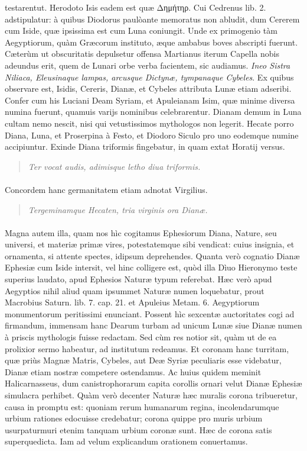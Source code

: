 \documentclass[a4paper, 11pt, oneside, polutonikogreek, latin]{article}
\begin{document}
testarentut. Herodoto Isis eadem est quæ Δημήτηρ. Cui Cedrenus lib. 2. adstipulatur: à quibus Diodorus paulòante memoratus non abludit, dum Cererem cum Iside, quæ ipsissima est cum Luna coniungit. Unde ex primogenio tàm Aegyptiorum, quàm Græcorum instituto, æque ambabus boves abscripti fuerunt. Cæterùm ut obscuritatis depulsetur offensa Martianus iterum Capella nobis adeundus erit, quem de Lunari orbe verba facientem, sic audiamus. \emph{Ineo Sistra Niliaca, Eleusinaque lampas, arcusque Dictynæ, tympanaque Cybeles}. Ex quibus observare est, Isidis, Cereris, Dianæ, et Cybeles attributa Lunæ etiam adseribi. Confer cum his Luciani Deam Syriam, et Apuleianam Isim, quæ minime diversa numina fuerunt, quamuis varijs nominibus celebrarentur. Dianam demum in Luna cultam nemo nescit, nisi qui vetustissimos mythologos non legerit. Hecate porro Diana, Luna, et Proserpina à Festo, et Diodoro Siculo pro uno eodemque numine accipiuntur. Exinde Diana triformis fingebatur, in quam extat Horatij versus.
\begin{quote}
\emph{Ter vocat audis, adimisque letho diua triformis.}
\end{quote}
\vspace*{-4mm}
\paragraph{}
Concordem hanc germanitatem etiam adnotat Virgilius.
\begin{quote}
\emph{Tergeminamque Hecaten, tria virginis ora Dianæ.}
\end{quote}
\vspace*{-4mm}
\paragraph{}
Magna autem illa, quam nos hìc cogitamus Ephesiorum Diana, Nature, seu universi, et materiæ primæ vires, potestatemque sibi vendicat: cuius insignia, et ornamenta, si attente spectes, idipsum deprehendes. Quanta verò cognatio Dianæ Ephesiæ cum Iside intersit, vel hinc colligere est, quòd illa Dìuo Hieronymo teste superius laudato, apud Ephesios Naturæ typum referebat. Hæc verò apud Aegyptios nihil aliud quam ipsummet Naturæ numen loquebatur, prout Macrobius Saturn. lib. 7. cap. 21. et Apuleius Metam. 6. Aegyptiorum monumentorum peritissimi enunciant. Possent hìc sexcentæ auctoritates cogi ad firmandum, immensam hanc Dearum turbam ad unicum Lunæ siue Dianæ numen à priscis mythologis fuisse redactam. Sed cùm res notior sit, quàm ut de ea prolixior sermo habeatur, ad institutum redeamus. Et coronam hanc turritam, quæ priùs Magnæ Matris, Cybeles, aut Deæ Syriæ peculiaris esse videbatur, Dianæ etiam nostræ competere ostendamus. Ac huius quidem meminit Halicarnasseus, dum canistrophorarum capita corollis ornari velut Dianæ Ephesiæ simulacra perhibet. Quàm verò decenter Naturæ hæc muralis corona tribueretur, causa in promptu est: quoniam rerum humanarum regina, incolendarumque urbium rationes edocuisse credebatur; corona quippe pro muris urbium usurpaturmuri etenim tanquam urbium coronæ sunt. Hæc de corona satis superquedicta. Iam ad velum explicandum orationem conuertamus.
\clearpage
\end{document}
